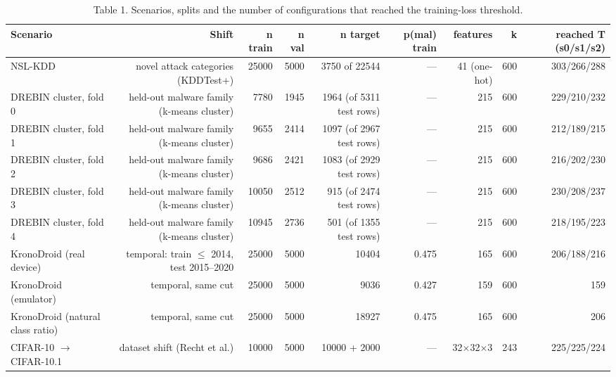 \begin{table}[t]
\centering\small
\caption{Table 1. Scenarios, splits and the number of configurations that reached the training-loss threshold.}
\label{tab:scenarios}
\begin{tabular}{lrrrrrrrr}
\toprule
Scenario & Shift & n train & n val & n target & p(mal) train & features & k & reached T (s0/s1/s2) \\
\midrule
NSL-KDD & novel attack categories (KDDTest+) & 25000 & 5000 & 3750 of 22544 & — & 41 (one-hot) & 600 & 303/266/288 \\
DREBIN cluster, fold 0 & held-out malware family (k-means cluster) & 7780 & 1945 & 1964 (of 5311 test rows) & — & 215 & 600 & 229/210/232 \\
DREBIN cluster, fold 1 & held-out malware family (k-means cluster) & 9655 & 2414 & 1097 (of 2967 test rows) & — & 215 & 600 & 212/189/215 \\
DREBIN cluster, fold 2 & held-out malware family (k-means cluster) & 9686 & 2421 & 1083 (of 2929 test rows) & — & 215 & 600 & 216/202/230 \\
DREBIN cluster, fold 3 & held-out malware family (k-means cluster) & 10050 & 2512 & 915 (of 2474 test rows) & — & 215 & 600 & 230/208/237 \\
DREBIN cluster, fold 4 & held-out malware family (k-means cluster) & 10945 & 2736 & 501 (of 1355 test rows) & — & 215 & 600 & 218/195/223 \\
KronoDroid (real device) & temporal: train $\leq$ 2014, test 2015–2020 & 25000 & 5000 & 10404 & 0.475 & 165 & 600 & 206/188/216 \\
KronoDroid (emulator) & temporal, same cut & 25000 & 5000 & 9036 & 0.427 & 159 & 600 & 159 \\
KronoDroid (natural class ratio) & temporal, same cut & 25000 & 5000 & 18927 & 0.475 & 165 & 600 & 206 \\
CIFAR-10 $\rightarrow$ CIFAR-10.1 & dataset shift (Recht et al.) & 10000 & 5000 & 10000 + 2000 & — & 32$\times$32$\times$3 & 243 & 225/225/224 \\
\bottomrule
\end{tabular}
\end{table}
